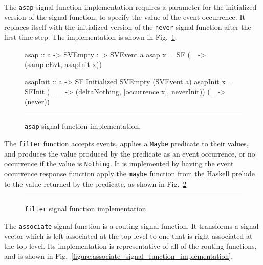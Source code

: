 \documentclass[draft]{llncs}
\begin{document}
The {\tt asap} signal function implementation requires a parameter for the
initialized version of the signal function, to specify the value of the event
occurrence. It replaces itself with the initialized version of the {\tt never}
signal function after the first time step. The implementation is shown in
Fig.~\ref{figure:asap_signal_function_implementation}.

\begin{figure}
\begin{code}
asap :: a -> SVEmpty :~> SVEvent a
asap x = SF (\_ -> (sampleEvt, asapInit x))

asapInit :: a -> SF Initialized SVEmpty (SVEvent a)
asapInit x = SFInit (\_ _ -> (deltaNothing, [occurrence x], neverInit))
                    (\_ -> (never))
\end{code}
\hrule
\caption{{\tt asap} signal function implementation.}
\label{figure:asap_signal_function_implementation}
\end{figure}

The {\tt filter} function accepts events, applies a {\tt Maybe} predicate to
their values, and produces the value produced by the predicate as an event
occurrence, or no occurrence if the value is {\tt Nothing}. It is implemented
by having the event occurrence response function apply the {\tt maybe} function
from the Haskell prelude to the value returned by the predicate, as shown in 
Fig.~\ref{figure:filter_signal_function_implementation}

\begin{figure}[t]
\hrule
\caption{{\tt filter} signal function implementation.}
\label{figure:filter_signal_function_implementation}
\end{figure}

The {\tt associate} signal function is a routing signal function. It transforms
a signal vector which is left-associated at the top level to one that is
right-associated at the top level. Its implementation is representative of all
of the routing functions, and is shown in Fig.~\ref{figure:associate_signal_function_implementation}.
\end{document}
